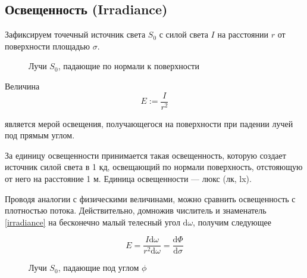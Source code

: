 \documentclass[12pt]{article}
\def\d{ \mathrm{d} }
\begin{document}
\subsection{Освещенность (Irradiance)}

Зафиксируем точечный источник света $S_0$ с силой света $I$ на расстоянии $r$ от поверхности площадью $\sigma$.
\begin{figure}[h]
  \begin{center}
    \caption{Лучи $S_0$, падающие по нормали к поверхности}
  \end{center}
\end{figure}

Величина
\begin{equation}\label{irradiance}
  E:=\frac{I}{r^2}
\end{equation}

является мерой освещения, получающегося на поверхности при падении лучей под прямым углом.

За единицу освещенности принимается такая освещенность, которую создает
источник силой света в 1 кд, освещающий по нормали поверхность,
отстояющую от него на расстояние 1 м. Единица освещенности — люкс (лк, lx).

Проводя аналогии с физическими величинами, можно сравнить освещенность с плотностью потока.
Действительно, домножив числитель и знаменатель \eqref{irradiance} на бесконечно малый телесный
угол $\d\omega$, получим следующее

\[E=\frac{I\d\omega}{r^2\d\omega}=\frac{\d\Phi}{\d\sigma}\]

\begin{figure}[h]
  \begin{center}
    \caption{Лучи $S_0$, падающие под углом $\phi$}
    \label{irradiance_under_angle}
  \end{center}
\end{figure}
\end{document}
